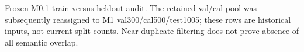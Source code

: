 \begin{table}[t]
\centering\scriptsize
\caption{Appendix: Historical train-versus-heldout overlap}
\label{tab:appendix-dedup}
\par\smallskip\parbox{\textwidth}{\scriptsize Frozen M0.1 train-versus-heldout audit. The retained val/cal pool was subsequently reassigned to M1 val300/cal500/test1005; these rows are historical inputs, not current split counts. Near-duplicate filtering does not prove absence of all semantic overlap.}
\end{table}
